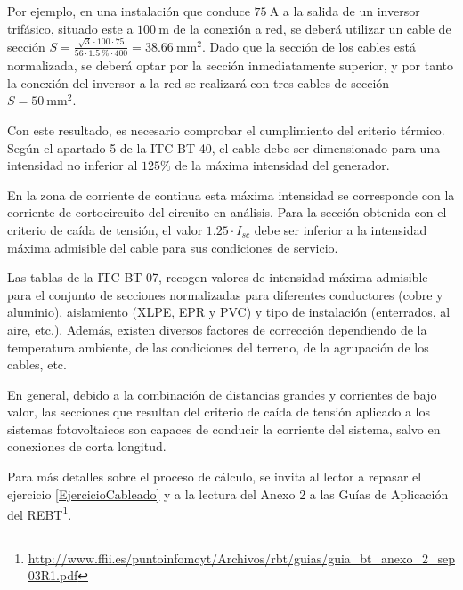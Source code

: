 Por ejemplo, en una instalación que conduce $\SI{75}{\ampere}$ a la
salida de un inversor trifásico, situado este a $\SI{100}{\meter}$ de
la conexión a red, se deberá utilizar un cable de sección
$S=\frac{\sqrt{3}\cdot100\cdot75}{56\cdot\SI{1.5}{\percent}\cdot400}=\SI{38.66}{\milli\meter\squared}$.
Dado que la sección de los cables está normalizada, se deberá optar
por la sección inmediatamente superior, y por tanto la conexión del
inversor a la red se realizará con tres cables de sección
$S=\SI{50}{\milli\meter\squared}$.

Con este resultado, es necesario comprobar el cumplimiento del
criterio térmico. Según el apartado 5 de la ITC-BT-40, el cable debe
ser dimensionado para una intensidad no inferior al $125\%$ de la
máxima intensidad del generador.

En la zona de corriente de continua esta máxima intensidad se
corresponde con la corriente de cortocircuito del circuito en
análisis. Para la sección obtenida con el criterio de caída de
tensión, el valor $1.25 \cdot I_{sc}$ debe ser inferior a la
intensidad máxima admisible del cable para sus condiciones de
servicio.

Las tablas de la ITC-BT-07, recogen valores de intensidad máxima
admisible para el conjunto de secciones normalizadas para diferentes
conductores (cobre y aluminio), aislamiento (XLPE, EPR y PVC) y tipo
de instalación (enterrados, al aire, etc.). Además, existen diversos
factores de corrección dependiendo de la temperatura ambiente, de las
condiciones del terreno, de la agrupación de los cables, etc.

En general, debido a la combinación de distancias grandes y corrientes
de bajo valor, las secciones que resultan del criterio de caída de
tensión aplicado a los sistemas fotovoltaicos son capaces de conducir
la corriente del sistema, salvo en conexiones de corta longitud.

Para más detalles sobre el proceso de cálculo, se invita al lector a
repasar el ejercicio \ref{EjercicioCableado} y a la lectura del Anexo
2 a las Guías de Aplicación del
REBT\footnote{\url{http://www.ffii.es/puntoinfomcyt/Archivos/rbt/guias/guia_bt_anexo_2_sep03R1.pdf}}.






